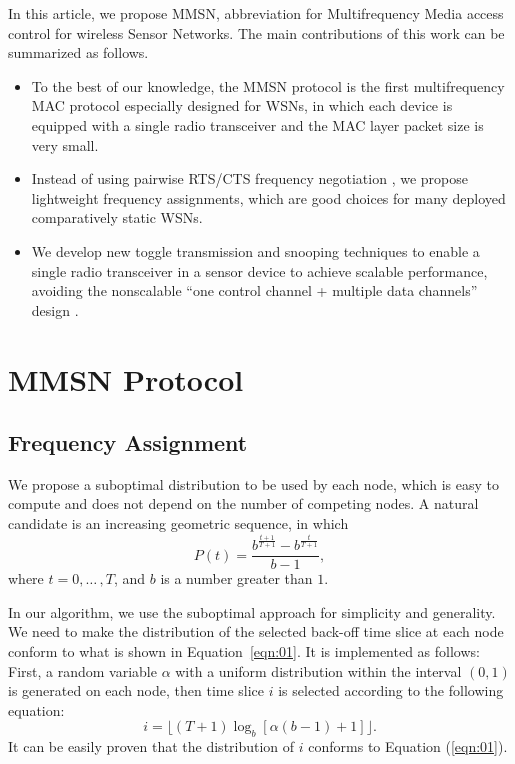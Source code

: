 \documentclass[format=acmsmall, review=false]{acmart}
\begin{document}
In this article, we propose MMSN, abbreviation for Multifrequency
Media access control for wireless Sensor Networks. The main
contributions of this work can be summarized as follows.
\begin{itemize}
	\item To the best of our knowledge, the MMSN protocol is the first
	multifrequency MAC protocol especially designed for WSNs, in which
	each device is equipped with a single radio transceiver and
	the MAC layer packet size is very small.
	\item Instead of using pairwise RTS/CTS frequency negotiation
	\cite{Adya-01, Culler-01, Tzamaloukas-01, Zhou-06},
	we propose lightweight frequency assignments, which are good choices
	for many deployed comparatively static WSNs.
	\item We develop new toggle transmission and snooping techniques to
	enable a single radio transceiver in a sensor device to achieve
	scalable performance, avoiding the nonscalable ``one
	control channel + multiple data channels'' design \cite{Natarajan-01}.
\end{itemize}

\section{MMSN Protocol}

\subsection{Frequency Assignment}

We propose a suboptimal distribution to be used by each node, which is
easy to compute and does not depend on the number of competing
nodes. A natural candidate is an increasing geometric sequence, in
which
\begin{equation}
\label{eqn:01}
P(t)=\frac{b^{\frac{t+1}{T+1}}-b^{\frac{t}{T+1}}}{b-1},
\end{equation}
where $t=0,{\ldots}\,,T$, and $b$ is a number greater than $1$.

In our algorithm, we use the suboptimal approach for simplicity and
generality. We need to make the distribution of the selected back-off
time slice at each node conform to what is shown in
Equation~\eqref{eqn:01}. It is implemented as follows: First, a random
variable $\alpha$ with a uniform distribution within the interval $(0,
1)$ is generated on each node, then time slice $i$ is selected
according to the following equation:
\[
i=\lfloor(T+1)\log_b[\alpha(b-1)+1]\rfloor.
\]
It can be easily proven that the distribution of $i$ conforms to Equation
(\ref{eqn:01}).
\end{document}

